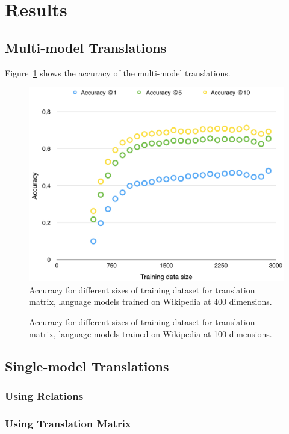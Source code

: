 \section{Results}
\label{sec:results}


\subsection{Multi-model Translations}
Figure~\ref{fig:accuracy_nlwiki400_enwiki400_lowercase} shows the accuracy of the multi-model translations.

\begin{figure}[ht!]
  \centering \includegraphics[width=\linewidth]{images/accuracy_nlwiki400_enwiki400_lowercase}
  \caption{Accuracy for different sizes of training dataset for translation matrix, language models trained on Wikipedia at 400 dimensions.}
  \label{fig:accuracy_nlwiki400_enwiki400_lowercase}
\end{figure}

\begin{figure}[ht!]
  \caption{Accuracy for different sizes of training dataset for translation matrix, language models trained on Wikipedia at 100 dimensions.}
  \label{fig:accuracy_nlwiki100_enwiki100_lowercase}
\end{figure}

\subsection{Single-model Translations}
\subsubsection{Using Relations}

\subsubsection{Using Translation Matrix}
